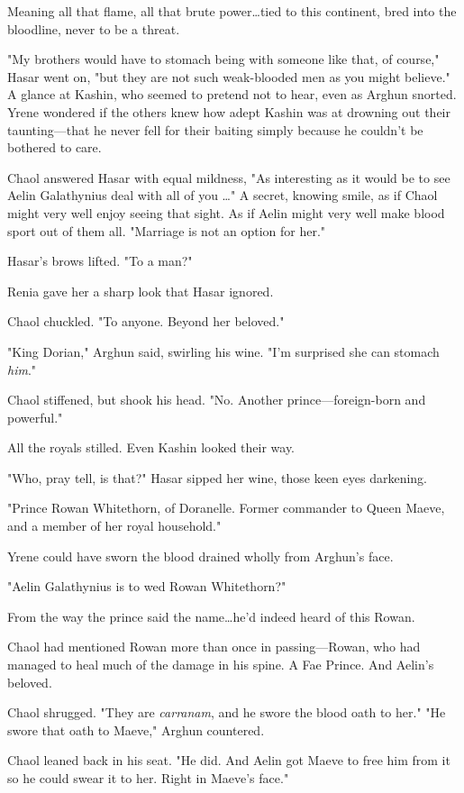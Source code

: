 Meaning all that flame, all that brute power\ldots tied to this continent, bred into the bloodline, never to be a threat.

"My brothers would have to stomach being with someone like that, of course," Hasar went on, "but they are not such weak-blooded men as you might believe."
A glance at Kashin, who seemed to pretend not to hear, even as Arghun snorted.
Yrene wondered if the others knew how adept Kashin was at drowning out their taunting---that he never fell for their baiting simply because he couldn't be bothered to care.

Chaol answered Hasar with equal mildness, "As interesting as it would be to see Aelin Galathynius deal with all of you \ldots" A secret, knowing smile, as if Chaol might very well enjoy seeing that sight.
As if Aelin might very well make blood sport out of them all.
"Marriage is not an option for her."

Hasar's brows lifted.
"To a man?"

Renia gave her a sharp look that Hasar ignored.

Chaol chuckled.
"To anyone.
Beyond her beloved."

"King Dorian," Arghun said, swirling his wine.
"I'm surprised she can stomach \emph{him}."

Chaol stiffened, but shook his head.
"No.
Another prince---foreign-born and powerful."

All the royals stilled.
Even Kashin looked their way.

"Who, pray tell, is that?"
Hasar sipped her wine, those keen eyes darkening.

"Prince Rowan Whitethorn, of Doranelle.
Former commander to Queen Maeve, and a member of her royal household."

Yrene could have sworn the blood drained wholly from Arghun's face.

"Aelin Galathynius is to wed Rowan Whitethorn?"

From the way the prince said the name\ldots he'd indeed heard of this Rowan.

Chaol had mentioned Rowan more than once in passing---Rowan, who had managed to heal much of the damage in his spine.
A Fae Prince.
And Aelin's beloved.

Chaol shrugged.
"They are \emph{carranam}, and he swore the blood oath to her."
"He swore that oath to Maeve," Arghun countered.

Chaol leaned back in his seat.
"He did.
And Aelin got Maeve to free him from it so he could swear it to her.
Right in Maeve's face."

